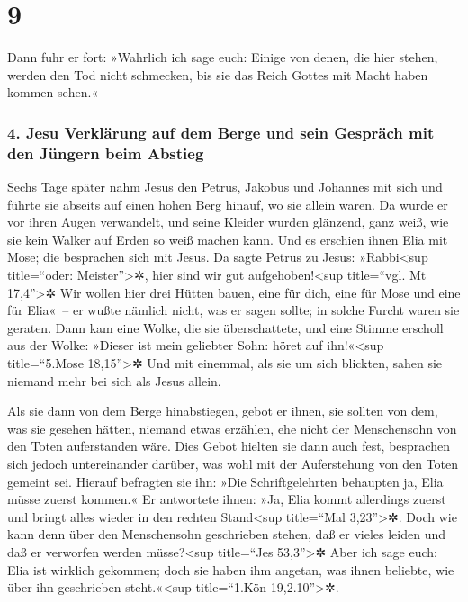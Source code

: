 \hypertarget{section-8}{%
\section{9}\label{section-8}}

 Dann fuhr er fort: »Wahrlich ich sage euch: Einige von
denen, die hier stehen, werden den Tod nicht schmecken, bis sie das
Reich Gottes mit Macht haben kommen sehen.«

\hypertarget{jesu-verkluxe4rung-auf-dem-berge-und-sein-gespruxe4ch-mit-den-juxfcngern-beim-abstieg}{%
\subsubsection{4. Jesu Verklärung auf dem Berge und sein Gespräch mit
den Jüngern beim
Abstieg}\label{jesu-verkluxe4rung-auf-dem-berge-und-sein-gespruxe4ch-mit-den-juxfcngern-beim-abstieg}}

 Sechs Tage später nahm Jesus den Petrus, Jakobus und
Johannes mit sich und führte sie abseits auf einen hohen Berg hinauf, wo
sie allein waren. Da wurde er vor ihren Augen verwandelt, 
und seine Kleider wurden glänzend, ganz weiß, wie sie kein Walker auf
Erden so weiß machen kann.  Und es erschien ihnen Elia mit
Mose; die besprachen sich mit Jesus.  Da sagte Petrus zu
Jesus: »Rabbi\textless sup title=``oder: Meister''\textgreater✲, hier
sind wir gut aufgehoben!\textless sup title=``vgl. Mt
17,4''\textgreater✲ Wir wollen hier drei Hütten bauen, eine für dich,
eine für Mose und eine für Elia«~--  er wußte nämlich
nicht, was er sagen sollte; in solche Furcht waren sie geraten.
 Dann kam eine Wolke, die sie überschattete, und eine
Stimme erscholl aus der Wolke: »Dieser ist mein geliebter Sohn: höret
auf ihn!«\textless sup title=``5.Mose 18,15''\textgreater✲
 Und mit einemmal, als sie um sich blickten, sahen sie
niemand mehr bei sich als Jesus allein.

 Als sie dann von dem Berge hinabstiegen, gebot er ihnen,
sie sollten von dem, was sie gesehen hätten, niemand etwas erzählen, ehe
nicht der Menschensohn von den Toten auferstanden wäre. 
Dies Gebot hielten sie dann auch fest, besprachen sich jedoch
untereinander darüber, was wohl mit der Auferstehung von den Toten
gemeint sei.  Hierauf befragten sie ihn: »Die
Schriftgelehrten behaupten ja, Elia müsse zuerst kommen.«
 Er antwortete ihnen: »Ja, Elia kommt allerdings zuerst
und bringt alles wieder in den rechten Stand\textless sup title=``Mal
3,23''\textgreater✲. Doch wie kann denn über den Menschensohn
geschrieben stehen, daß er vieles leiden und daß er verworfen werden
müsse?\textless sup title=``Jes 53,3''\textgreater✲  Aber
ich sage euch: Elia ist wirklich gekommen; doch sie haben ihm angetan,
was ihnen beliebte, wie über ihn geschrieben steht.«\textless sup
title=``1.Kön 19,2.10''\textgreater✲.


